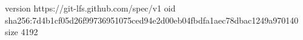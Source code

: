 version https://git-lfs.github.com/spec/v1
oid sha256:7d4b1cf05d26f99736951075ced94e2d00eb04fbdfa1aec78dbac1249a970140
size 4192
